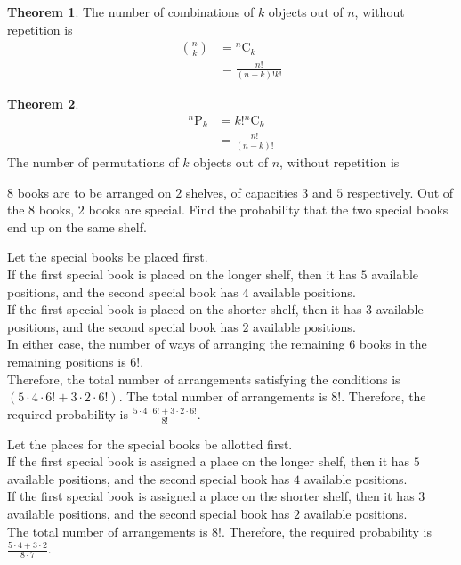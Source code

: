 \documentclass[titlepage, fleqn, a4paper, 12pt, twoside]{article}
\theoremstyle{definition}
\theoremstyle{theorem}
\newtheorem{theorem}{Theorem}
\newcommand*{\perm}[2]{{}^{#1}\mathrm{P}_{#2}}%
\newcommand*{\comb}[2]{{}^{#1}\mathrm{C}_{#2}}%
\begin{document}
\begin{theorem}
	The number of combinations of $k$ objects out of $n$, without repetition is
	\begin{align*}
		\binom{n}{k} & = \comb{n}{k} \\
                             & = \frac{n!}{(n - k)! k!}
	\end{align*}
\end{theorem}

\begin{theorem}
	\begin{align*}
		\perm{n}{k} & = k! \comb{n}{k} \\
                            & = \frac{n!}{(n - k)!}
	\end{align*}
	The number of permutations of $k$ objects out of $n$, without repetition is
\end{theorem}

\begin{question}
	$8$ books are to be arranged on $2$ shelves, of capacities $3$ and $5$ respectively.
	Out of the $8$ books, $2$ books are special.
	Find the probability that the two special books end up on the same shelf.
\end{question}

\begin{solution}
	Let the special books be placed first.\\
	If the first special book is placed on the longer shelf, then it has $5$ available positions, and the second special book has $4$ available positions.\\
	If the first special book is placed on the shorter shelf, then it has $3$ available positions, and the second special book has $2$ available positions.\\
	In either case, the number of ways of arranging the remaining $6$ books in the remaining positions is $6!$.\\
	Therefore, the total number of arrangements satisfying the conditions is $(5 \cdot 4 \cdot 6! + 3 \cdot 2 \cdot 6!)$.
	The total number of arrangements is $8!$.
	Therefore, the required probability is $\frac{5 \cdot 4 \cdot 6! + 3 \cdot 2 \cdot 6!}{8!}$.
\end{solution}

\begin{solution}
	Let the places for the special books be allotted first.\\
	If the first special book is assigned a place on the longer shelf, then it has $5$ available positions, and the second special book has $4$ available positions.\\
	If the first special book is assigned a place on the shorter shelf, then it has $3$ available positions, and the second special book has $2$ available positions.\\
	The total number of arrangements is $8!$.
	Therefore, the required probability is $\frac{5 \cdot 4 + 3 \cdot 2}{8 \cdot 7}$.
\end{solution}
\end{document}
